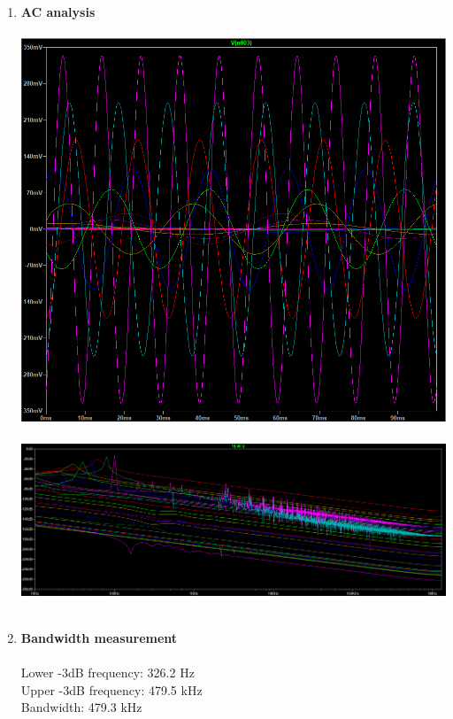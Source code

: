 \documentclass{article}
\begin{document}
\begin{enumerate}
		\item \textbf{AC analysis}\\\\
		\includegraphics[scale=0.65]{prelab 3/prelab 3 ex3.5 1}\\\\
		\includegraphics[scale=0.45]{prelab 3/prelab 3 ex3.5 2}\\\\
		\item \textbf{Bandwidth measurement}\\\\
		Lower -3dB frequency: 326.2 Hz\\
		Upper -3dB frequency: 479.5 kHz \\
		Bandwidth: 479.3 kHz \\
	\end{enumerate}
\end{document}

